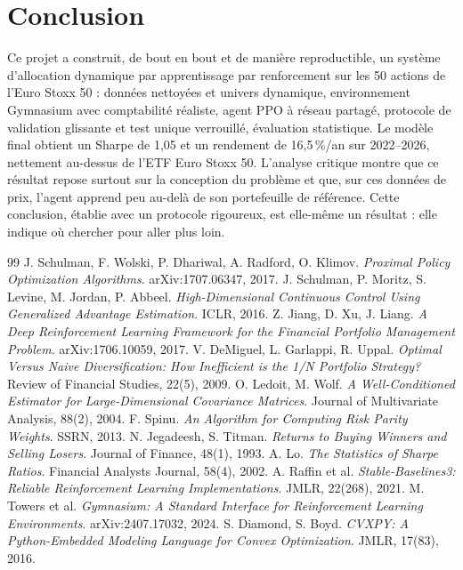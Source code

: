 \documentclass[11pt,a4paper]{article}
\begin{document}
\section{Conclusion}
Ce projet a construit, de bout en bout et de manière reproductible, un système d'allocation dynamique par
apprentissage par renforcement sur les 50 actions de l'Euro Stoxx 50 : données nettoyées et univers
dynamique, environnement Gymnasium avec comptabilité réaliste, agent PPO à réseau partagé, protocole de
validation glissante et test unique verrouillé, évaluation statistique. Le modèle final obtient un Sharpe de
1,05 et un rendement de 16,5\,\%/an sur 2022--2026, nettement au-dessus de l'ETF Euro Stoxx 50. L'analyse
critique montre que ce résultat repose surtout sur la conception du problème et que, sur ces données de prix,
l'agent apprend peu au-delà de son portefeuille de référence. Cette conclusion, établie avec un protocole
rigoureux, est elle-même un résultat : elle indique où chercher pour aller plus loin.

\begin{thebibliography}{99}\small
{} J. Schulman, F. Wolski, P. Dhariwal, A. Radford, O. Klimov. \emph{Proximal Policy Optimization Algorithms}. arXiv:1707.06347, 2017.
 J. Schulman, P. Moritz, S. Levine, M. Jordan, P. Abbeel. \emph{High-Dimensional Continuous Control Using Generalized Advantage Estimation}. ICLR, 2016.
 Z. Jiang, D. Xu, J. Liang. \emph{A Deep Reinforcement Learning Framework for the Financial Portfolio Management Problem}. arXiv:1706.10059, 2017.
 V. DeMiguel, L. Garlappi, R. Uppal. \emph{Optimal Versus Naive Diversification: How Inefficient is the 1/N Portfolio Strategy?} Review of Financial Studies, 22(5), 2009.
 O. Ledoit, M. Wolf. \emph{A Well-Conditioned Estimator for Large-Dimensional Covariance Matrices}. Journal of Multivariate Analysis, 88(2), 2004.
 F. Spinu. \emph{An Algorithm for Computing Risk Parity Weights}. SSRN, 2013.
 N. Jegadeesh, S. Titman. \emph{Returns to Buying Winners and Selling Losers}. Journal of Finance, 48(1), 1993.
 A. Lo. \emph{The Statistics of Sharpe Ratios}. Financial Analysts Journal, 58(4), 2002.
 A. Raffin et al. \emph{Stable-Baselines3: Reliable Reinforcement Learning Implementations}. JMLR, 22(268), 2021.
 M. Towers et al. \emph{Gymnasium: A Standard Interface for Reinforcement Learning Environments}. arXiv:2407.17032, 2024.
 S. Diamond, S. Boyd. \emph{CVXPY: A Python-Embedded Modeling Language for Convex Optimization}. JMLR, 17(83), 2016.
\end{thebibliography}
\end{document}
